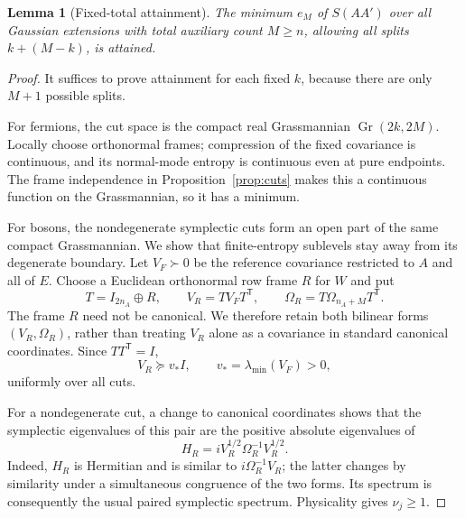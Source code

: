 \documentclass[11pt,a4paper]{article}
\numberwithin{equation}{section}
\newtheorem{lemma}[theorem]{Lemma}
\theoremstyle{remark}
\newcommand{\T}{\mathsf T}
\newcommand{\Gr}{\operatorname{Gr}}
\begin{document}
\begin{lemma}[Fixed-total attainment]\label{lem:attainment}
The minimum $e_M$ of $S(AA')$ over all Gaussian extensions with total auxiliary count $M\ge n$, allowing all splits $k+(M-k)$, is attained.
\end{lemma}
\begin{proof}
It suffices to prove attainment for each fixed $k$, because there are only $M+1$ possible splits.

For fermions, the cut space is the compact real Grassmannian $\Gr(2k,2M)$. Locally choose orthonormal frames; compression of the fixed covariance is continuous, and its normal-mode entropy is continuous even at pure endpoints. The frame independence in Proposition~\ref{prop:cuts} makes this a continuous function on the Grassmannian, so it has a minimum.

For bosons, the nondegenerate symplectic cuts form an open part of the same compact Grassmannian. We show that finite-entropy sublevels stay away from its degenerate boundary. Let $V_F\succ0$ be the reference covariance restricted to $A$ and all of $E$. Choose a Euclidean orthonormal row frame $R$ for $W$ and put
\begin{equation}\label{eq:pair-reduction}
 T=I_{2n_A}\oplus R,\qquad
 V_R=TV_FT^{\T},\qquad
 \Omega_R=T\Omega_{n_A+M}T^{\T}.
\end{equation}
The frame $R$ need not be canonical. We therefore retain both bilinear forms $(V_R,\Omega_R)$, rather than treating $V_R$ alone as a covariance in standard canonical coordinates. Since $TT^{\T}=I$,
\begin{equation}\label{eq:lower-bound}
 V_R\succeq v_*I,\qquad v_*=\lambda_{\min}(V_F)>0,
\end{equation}
uniformly over all cuts.

For a nondegenerate cut, a change to canonical coordinates shows that the symplectic eigenvalues of this pair are the positive absolute eigenvalues of
\begin{equation}\label{eq:h-r}
 H_R=iV_R^{1/2}\Omega_R^{-1}V_R^{1/2}.
\end{equation}
Indeed, $H_R$ is Hermitian and is similar to $i\Omega_R^{-1}V_R$; the latter changes by similarity under a simultaneous congruence of the two forms. Its spectrum is consequently the usual paired symplectic spectrum. Physicality gives $\nu_j\ge1$.


\end{proof}
\end{document}
